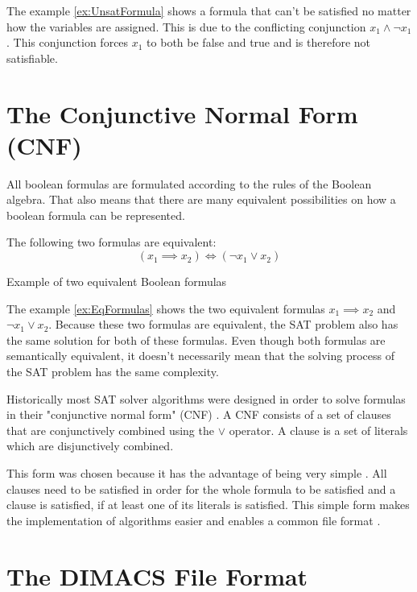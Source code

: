 The example \ref{ex:UnsatFormula} shows a formula that can't be satisfied no matter how the variables are assigned. This is due to the conflicting conjunction $x_1 \wedge \neg x_1$. This conjunction forces $x_1$ to both be false and true and is therefore not satisfiable.

\section{The Conjunctive Normal Form (CNF)}

All boolean formulas are formulated according to the rules of the Boolean algebra. That also means that there are many equivalent possibilities on how a boolean formula can be represented.

\begin{example}
\begin{leftbar}
The following two formulas are equivalent:
\begin{displaymath}
(x_1 \implies x_2) \iff (\neg x_1 \vee x_2)
\end{displaymath}
\end{leftbar}
\caption{Example of two equivalent Boolean formulas}
\label{ex:EqFormulas}
\end{example}

The example \ref{ex:EqFormulas} shows the two equivalent formulas $x_1 \implies x_2$ and $\neg x_1 \vee x_2$. Because these two formulas are equivalent, the SAT problem also has the same solution for both of these formulas. Even though both formulas are semantically equivalent, it doesn't necessarily mean that the solving process of the SAT problem has the same complexity.

Historically most SAT solver algorithms were designed in order to solve formulas in their "conjunctive normal form" (CNF) \cite{biere2009handbook}. A CNF consists of a set of clauses that are conjunctively combined using the $\vee$ operator. A clause is a set of literals which are disjunctively combined. \cite{biere2009handbook}

This form was chosen because it has the advantage of being very simple \cite{biere2009handbook}. All clauses need to be satisfied in order for the whole formula to be satisfied and a clause is satisfied, if at least one of its literals is satisfied. This simple form makes the implementation of algorithms easier and enables a common file format \cite{biere2009handbook}.

\section{The DIMACS File Format}

